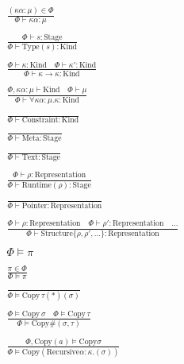 \documentclass {article}
\begin{document}
\begin{gather*}
\\
\frac
{(\kappa \alpha : \mu) \in \Phi}
{\Phi \vdash \kappa \alpha : \mu } \\
\\
\frac
{\Phi \vdash s : \text{Stage}}
{\Phi \vdash \text {Type} (s) : \text{Kind}} \\
\\
\frac
{\Phi \vdash \kappa : \text{Kind} \quad \Phi \vdash \kappa' : \text{Kind}}
{\Phi \vdash \kappa \to \kappa : \text{Kind} } \\
\\
\frac
{\Phi, \kappa \alpha : \mu \vdash \text{Kind} \quad \Phi \vdash \mu }
{\Phi \vdash \forall \kappa \alpha : \mu. \kappa : \text{Kind}  } \\
\\
\frac
{}
{\Phi \vdash \text{Constraint} : \text{Kind}} \\
\\
\frac
{}
{\Phi \vdash \text{Meta} : \text{Stage}} \\
\\
\frac
{}
{\Phi \vdash \text{Text} : \text{Stage}} \\
\\
\frac
{\Phi \vdash \rho : \text{Representation}}
{\Phi \vdash \text{Runtime} (\rho) : \text{Stage}} \\
\\
\frac
{}
{\Phi \vdash \text{Pointer} : \text{Representation}} \\
\\
\frac
{\Phi \vdash \rho : \text{Representation} \quad \Phi \vdash \rho' : \text{Representation} \quad \dots}
{\Phi \vdash \text{Structure} \{ \rho, \rho', \dots \} : \text{Representation} } \\
\\
\Phi \models \pi \tag*{[Qualified Validation]} \\
\\
\frac
{\pi \in \Phi}
{\Phi \models \pi} \\
\\
\frac
{}
{\Phi \models \text{Copy} \, \tau(*)(\sigma)} \\
\\
\frac
{\Phi \models \text {Copy} \, \sigma \quad \Phi \models \text{Copy} \, \tau}
{\Phi \models \text{Copy} \#(\sigma, \tau) } \\
\\
\frac
{\Phi, \text{Copy}(a)  \models \text{Copy} \sigma }
{\Phi \models \text{Copy} (\text{Recursive} \alpha : \kappa. (\sigma)) }
\end{gather*}
\end{document}

